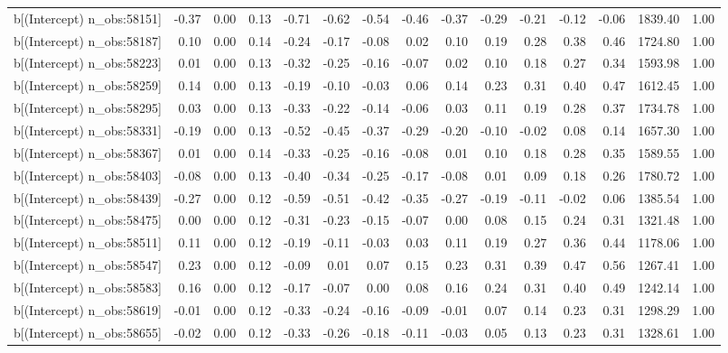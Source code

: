 \begin{table}[ht]
\begin{tabular}{rrrrrrrrrrrrrrr}
  b[(Intercept) n\_obs:58151] & -0.37 & 0.00 & 0.13 & -0.71 & -0.62 & -0.54 & -0.46 & -0.37 & -0.29 & -0.21 & -0.12 & -0.06 & 1839.40 & 1.00 \\ 
  b[(Intercept) n\_obs:58187] & 0.10 & 0.00 & 0.14 & -0.24 & -0.17 & -0.08 & 0.02 & 0.10 & 0.19 & 0.28 & 0.38 & 0.46 & 1724.80 & 1.00 \\ 
  b[(Intercept) n\_obs:58223] & 0.01 & 0.00 & 0.13 & -0.32 & -0.25 & -0.16 & -0.07 & 0.02 & 0.10 & 0.18 & 0.27 & 0.34 & 1593.98 & 1.00 \\ 
  b[(Intercept) n\_obs:58259] & 0.14 & 0.00 & 0.13 & -0.19 & -0.10 & -0.03 & 0.06 & 0.14 & 0.23 & 0.31 & 0.40 & 0.47 & 1612.45 & 1.00 \\ 
  b[(Intercept) n\_obs:58295] & 0.03 & 0.00 & 0.13 & -0.33 & -0.22 & -0.14 & -0.06 & 0.03 & 0.11 & 0.19 & 0.28 & 0.37 & 1734.78 & 1.00 \\ 
  b[(Intercept) n\_obs:58331] & -0.19 & 0.00 & 0.13 & -0.52 & -0.45 & -0.37 & -0.29 & -0.20 & -0.10 & -0.02 & 0.08 & 0.14 & 1657.30 & 1.00 \\ 
  b[(Intercept) n\_obs:58367] & 0.01 & 0.00 & 0.14 & -0.33 & -0.25 & -0.16 & -0.08 & 0.01 & 0.10 & 0.18 & 0.28 & 0.35 & 1589.55 & 1.00 \\ 
  b[(Intercept) n\_obs:58403] & -0.08 & 0.00 & 0.13 & -0.40 & -0.34 & -0.25 & -0.17 & -0.08 & 0.01 & 0.09 & 0.18 & 0.26 & 1780.72 & 1.00 \\ 
  b[(Intercept) n\_obs:58439] & -0.27 & 0.00 & 0.12 & -0.59 & -0.51 & -0.42 & -0.35 & -0.27 & -0.19 & -0.11 & -0.02 & 0.06 & 1385.54 & 1.00 \\ 
  b[(Intercept) n\_obs:58475] & 0.00 & 0.00 & 0.12 & -0.31 & -0.23 & -0.15 & -0.07 & 0.00 & 0.08 & 0.15 & 0.24 & 0.31 & 1321.48 & 1.00 \\ 
  b[(Intercept) n\_obs:58511] & 0.11 & 0.00 & 0.12 & -0.19 & -0.11 & -0.03 & 0.03 & 0.11 & 0.19 & 0.27 & 0.36 & 0.44 & 1178.06 & 1.00 \\ 
  b[(Intercept) n\_obs:58547] & 0.23 & 0.00 & 0.12 & -0.09 & 0.01 & 0.07 & 0.15 & 0.23 & 0.31 & 0.39 & 0.47 & 0.56 & 1267.41 & 1.00 \\ 
  b[(Intercept) n\_obs:58583] & 0.16 & 0.00 & 0.12 & -0.17 & -0.07 & 0.00 & 0.08 & 0.16 & 0.24 & 0.31 & 0.40 & 0.49 & 1242.14 & 1.00 \\ 
  b[(Intercept) n\_obs:58619] & -0.01 & 0.00 & 0.12 & -0.33 & -0.24 & -0.16 & -0.09 & -0.01 & 0.07 & 0.14 & 0.23 & 0.31 & 1298.29 & 1.00 \\ 
  b[(Intercept) n\_obs:58655] & -0.02 & 0.00 & 0.12 & -0.33 & -0.26 & -0.18 & -0.11 & -0.03 & 0.05 & 0.13 & 0.23 & 0.31 & 1328.61 & 1.00 \\ 

\end{tabular}
\end{table}
